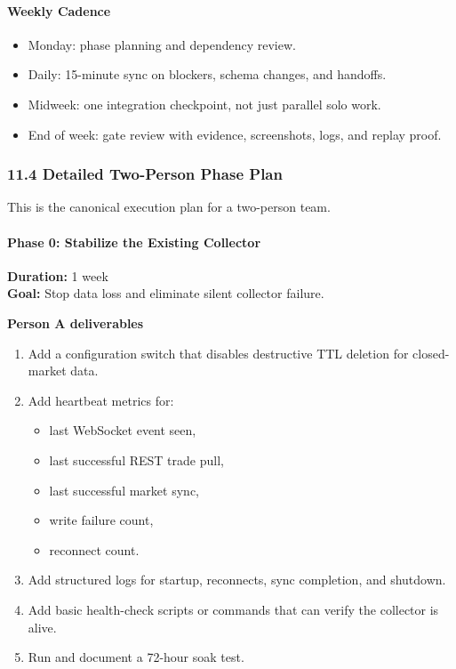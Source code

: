 \documentclass[
]{article}
\providecommand{\tightlist}{%
  \setlength{\itemsep}{0pt}\setlength{\parskip}{0pt}}
\begin{document}
\paragraph{Weekly Cadence}\label{weekly-cadence}

\begin{itemize}
\tightlist
\item
  Monday: phase planning and dependency review.
\item
  Daily: 15-minute sync on blockers, schema changes, and handoffs.
\item
  Midweek: one integration checkpoint, not just parallel solo work.
\item
  End of week: gate review with evidence, screenshots, logs, and replay
  proof.
\end{itemize}

\subsubsection{11.4 Detailed Two-Person Phase
Plan}\label{114-detailed-two-person-phase-plan}

This is the canonical execution plan for a two-person team.

\paragraph{Phase 0: Stabilize the Existing
Collector}\label{phase-0-stabilize-the-existing-collector}

\textbf{Duration:} 1 week\\
\textbf{Goal:} Stop data loss and eliminate silent collector failure.

\textbf{Person A deliverables}

\begin{enumerate}
\def\labelenumi{\arabic{enumi}.}
\tightlist
\item
  Add a configuration switch that disables destructive TTL deletion for
  closed-market data.
\item
  Add heartbeat metrics for:

  \begin{itemize}
  \tightlist
  \item
    last WebSocket event seen,
  \item
    last successful REST trade pull,
  \item
    last successful market sync,
  \item
    write failure count,
  \item
    reconnect count.
  \end{itemize}
\item
  Add structured logs for startup, reconnects, sync completion, and
  shutdown.
\item
  Add basic health-check scripts or commands that can verify the
  collector is alive.
\item
  Run and document a 72-hour soak test.
\end{enumerate}
\end{document}
